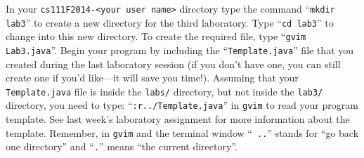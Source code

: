 In your {\tt cs111F2014-<your user name>} directory type the command ``{\tt mkdir lab3}'' to create a new directory for
the third laboratory.  \noindent Type ``{\tt cd lab3}'' to change into this new directory.  To create the required file,
type ``{\tt gvim Lab3.java}''. Begin your program by including the ``{\tt Template.java}'' file that you created during
the last laboratory session (if you don't have one, you can still create one if you'd like---it will save you time!).
Assuming that your {\tt Template.java} file is inside the {\tt labs/} directory, but not inside the {\tt lab3/}
directory, you need to type: ``{\tt :r../Template.java}'' in {\tt gvim} to read your program template.  See last week's
laboratory assignment for more information about the template. Remember, in {\tt gvim} and the terminal window ``{\tt
  ..}'' stands for ``go back one directory'' and ``{\tt .}'' means ``the current directory''.

\vspace{-0.15in}
